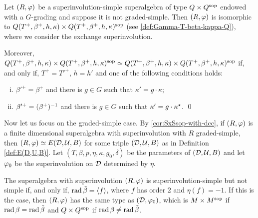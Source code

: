 \begin{thm}\label{thm:QxQ-type-I}
    Let $(R, \varphi)$ be a superinvolution-simple superalgebra of type ${Q\times Q^{\mathrm{sop}}}$ endowed with a $G$-grading and suppose it is not graded-simple. 
    Then $(R, \varphi)$ is isomorphic to $Q (T^+, \beta^+, h, \kappa) \times Q (T^+, \beta^+, h, \kappa)^{\mathrm{sop}}$ (see \cref{def:Gamma-T-beta-kappa-Q}), where we consider the exchange superinvolution. 
    
    \noindent
    Moreover, $Q (T^+, \beta^+, h, \kappa) \times Q (T^+, \beta^+, h, \kappa)^{\mathrm{sop}} \simeq Q (T^+, \beta^+, h, \kappa) \times Q (T^+, \beta^+, h, \kappa)^{\mathrm{sop}}$ if, and only if, $T^+ = T'^+$, $h = h'$ and one of the following conditions holds: 
    \begin{enumerate}[(i)]
	    \item $\beta'^+ = \beta^+$ and there is $g\in G$ such that $\kappa' = g \cdot \kappa$;
	    \item $\beta'^+ = (\beta^+)^{-1}$ and there is $g\in G$ such that $\kappa' = g \cdot \kappa^\star$. \qed
	\end{enumerate}
\end{thm}

Now let us focus on the graded-simple case. 
By \cref{cor:SxSsop-with-dcc}, if $(R, \varphi)$ is a finite dimensional superalgebra with superinvolution with $R$ graded-simple, then $(R, \varphi) \simeq E(\mathcal{D}, \mathcal U, B)$ for some triple $(\mathcal{D}, \mathcal U, B)$ as in Definition \ref{def:E(D,U,B)}. 
Let $(T, \beta, p, \eta, \kappa, g_0, \delta)$ be the parameters of $(\mathcal{D}, \mathcal U, B)$ and let $\varphi_0$ be the superinvolution on $\mathcal{D}$ determined by $\eta$. 



\begin{prop}\label{prop:types-of-D-via-rad-beta}
    The superalgebra with superinvolution $(R, \varphi)$ is superinvolution-simple but not simple if, and only if, $\operatorname{rad} \tilde\beta = \langle f \rangle$, where $f$ has order $2$ and $\eta(f) = -1$.
    If this is the case, then $(R, \varphi)$ has the same type as $(\mathcal{D}, \varphi_0)$, which is $M\times M^{\mathrm{sop}}$ if $\operatorname{rad} \beta = \operatorname{rad} \tilde\beta$ and $Q\times Q^{\mathrm{sop}}$ if $\operatorname{rad} \beta \neq \operatorname{rad} \tilde\beta$. 
\end{prop}

